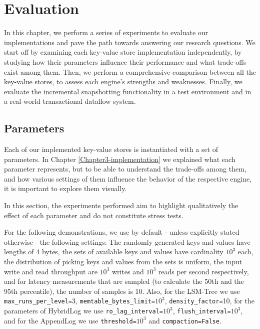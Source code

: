 
\chapter{Evaluation}

\label{Chapter4-evaluation}

In this chapter, we perform a series of experiments to evaluate our implementations and pave the path towards answering our research questions. We start off by examining each key-value store implementation independently, by studying how their parameters influence their performance and what trade-offs exist among them. Then, we perform a comprehensive comparison between all the key-value stores, to assess each engine's strengths and weaknesses. Finally, we evaluate the incremental snapshotting functionality in a test environment and in a real-world transactional dataflow system.

\section{Parameters}

Each of our implemented key-value stores is instantiated with a set of parameters. In Chapter \ref{Chapter3-implementation} we explained what each parameter represents, but to be able to understand the trade-offs among them, and how various settings of them influence the behavior of the respective engine, it is important to explore them visually.

In this section, the experiments performed aim to highlight qualitatively the effect of each parameter and do not constitute stress tests.

For the following demonstrations, we use by default - unless explicitly stated otherwise - the following settings: The randomly generated keys and values have lengths of 4 bytes, the sets of available keys and values have cardinality $10^3$ each, the distribution of picking keys and values from the sets is uniform, the input write and read throughput are $10^3$ writes and $10^3$ reads per second respectively, and for latency measurements that are sampled (to calculate the 50th and the 95th percentile), the number of samples is 10. Also, for the LSM-Tree we use \verb"max_runs_per_level="3, \verb"memtable_bytes_limit="$10^3$, \verb"density_factor="10, for the parameters of HybridLog we use \verb"ro_lag_interval="$10^3$, \verb"flush_interval="$10^3$, and for the AppendLog we use \verb|threshold=|$10^3$ and \verb"compaction=False".


